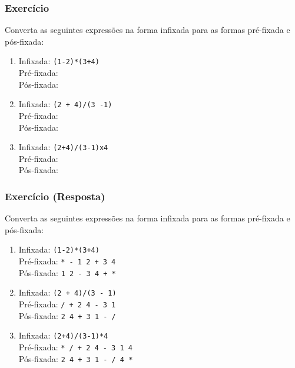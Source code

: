 \documentclass[aspectratio=169]{beamer}
\begin{document}
\begin{frame}\frametitle{Exercício}
Converta as seguintes expressões na forma infixada para as formas pré-fixada e pós-fixada:
\begin{enumerate}
	\item	Infixada: \texttt{(1-2)*(3+4)}\\
		Pré-fixada: \\
		Pós-fixada: \\
	\item	Infixada: \texttt{(2 + 4)/(3 -1)}\\
		Pré-fixada: \\
		Pós-fixada: \\
	\item	Infixada: \texttt{(2+4)/(3-1)x4}\\
		Pré-fixada: \\
		Pós-fixada: \\
\end{enumerate}
\end{frame}

\begin{frame}\frametitle{Exercício (Resposta)}
Converta as seguintes expressões na forma infixada para as formas pré-fixada e pós-fixada:
\begin{enumerate}
	\item	Infixada: \texttt{(1-2)*(3+4)}\\
		Pré-fixada: \texttt{* - 1 2 + 3 4}\\
		Pós-fixada: \texttt{1 2 - 3 4 + *}\\
	\item	Infixada: \texttt{(2 + 4)/(3 - 1)}\\
		Pré-fixada: \texttt{/ + 2 4 - 3 1}\\
		Pós-fixada: \texttt{2 4 + 3 1 - /}\\
	\item	Infixada: \texttt{(2+4)/(3-1)*4}\\
		Pré-fixada: \texttt{* / + 2 4 - 3 1 4}\\
		Pós-fixada: \texttt{2 4 + 3 1 - / 4 *}\\
\end{enumerate}
\end{frame}
\end{document}
